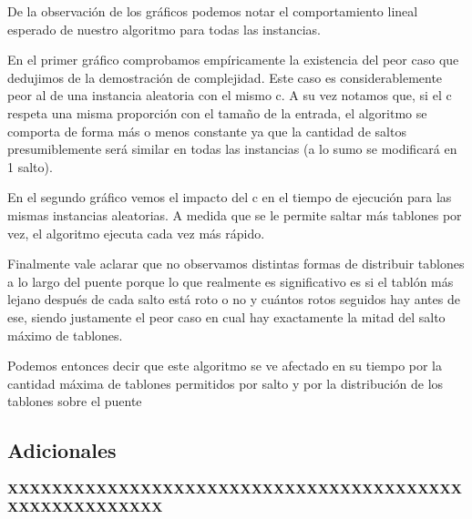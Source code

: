 De la observación de los gráficos podemos notar el comportamiento lineal esperado de nuestro algoritmo para todas las instancias.

En el primer gráfico comprobamos empíricamente la existencia del peor caso que dedujimos de la demostración de complejidad. Este caso es considerablemente peor al de una instancia  aleatoria con el mismo c. A su vez notamos que, si el c respeta una misma proporción con el tamaño de la entrada, el algoritmo se comporta de forma más o menos constante ya que la cantidad de saltos presumiblemente será similar en todas las instancias (a lo sumo se modificará en 1 salto).
 
En el segundo gráfico vemos el impacto del c en el tiempo de ejecución para las mismas instancias aleatorias. A medida que se le permite saltar más tablones por vez, el algoritmo ejecuta cada vez más rápido.

Finalmente vale aclarar que no observamos distintas formas de distribuir tablones a lo largo del puente porque lo que realmente es significativo es si el tablón más lejano después de cada salto está roto o no y cuántos rotos seguidos hay antes de ese, siendo justamente el peor caso en cual hay exactamente la mitad del salto máximo de tablones.

Podemos entonces decir que este algoritmo se ve afectado en su tiempo por la cantidad máxima de tablones permitidos por salto y por la distribución de los tablones sobre el puente


\subsection{Adicionales}

\textbf{XXXXXXXXXXXXXXXXXXXXXXXXXXXXXXXXXXXXXXXXXXXXXXXXXXXXXXX}
\clearpage